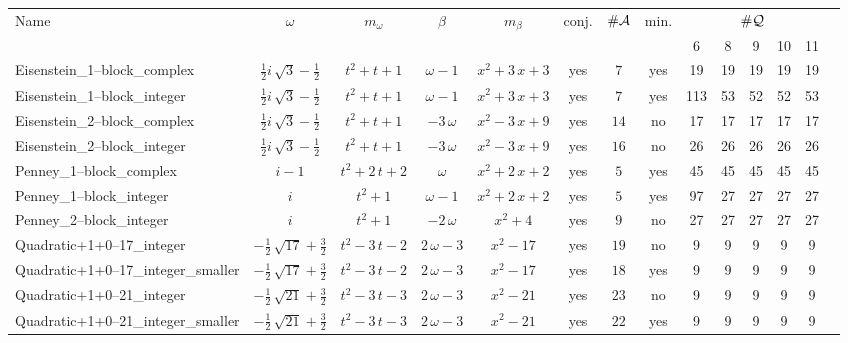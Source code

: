 \begin{tabular}{l|c c c c|ccc|c c  c  c  c  c }
\multirow{2}{*}{Name} & \multirow{2}{*}{$\omega$} & \multirow{2}{*}{$m_\omega$} & \multirow{2}{*}{$\beta$} & \multirow{2}{*}{$m_\beta$} & \multirow{2}{*}{conj.} & \multirow{2}{*}{$\#\mathcal{A}$} & \multirow{2}{*}{min.} & \multicolumn{5}{c}{$\#\mathcal{Q}$} \\
  &  &  &  &  &  &  &  & 6 & 8 & 9 & 10 & 11 \\ \hline
Eisenstein\_1--block\_complex & $ \frac{1}{2} i \, \sqrt{3} - \frac{1}{2} $ & $ t^{2} + t + 1 $ & $ \omega - 1 $ & $ x^{2} + 3 \, x + 3 $ & yes & $ 7 $ & yes & 19 & 19 & 19 & 19 & 19 \\
Eisenstein\_1--block\_integer & $ \frac{1}{2} i \, \sqrt{3} - \frac{1}{2} $ & $ t^{2} + t + 1 $ & $ \omega - 1 $ & $ x^{2} + 3 \, x + 3 $ & yes & $ 7 $ & yes & 113 & 53 & 52 & 52 & 53 \\
Eisenstein\_2--block\_complex & $ \frac{1}{2} i \, \sqrt{3} - \frac{1}{2} $ & $ t^{2} + t + 1 $ & $ -3 \, \omega $ & $ x^{2} - 3 \, x + 9 $ & yes & $ 14 $ & no & 17 & 17 & 17 & 17 & 17 \\
Eisenstein\_2--block\_integer & $ \frac{1}{2} i \, \sqrt{3} - \frac{1}{2} $ & $ t^{2} + t + 1 $ & $ -3 \, \omega $ & $ x^{2} - 3 \, x + 9 $ & yes & $ 16 $ & no & 26 & 26 & 26 & 26 & 26 \\
Penney\_1--block\_complex & $ i - 1 $ & $ t^{2} + 2 \, t + 2 $ & $ \omega $ & $ x^{2} + 2 \, x + 2 $ & yes & $ 5 $ & yes & 45 & 45 & 45 & 45 & 45 \\
Penney\_1--block\_integer & $ i $ & $ t^{2} + 1 $ & $ \omega - 1 $ & $ x^{2} + 2 \, x + 2 $ & yes & $ 5 $ & yes & 97 & 27 & 27 & 27 & 27 \\
Penney\_2--block\_integer & $ i $ & $ t^{2} + 1 $ & $ -2 \, \omega $ & $ x^{2} + 4 $ & yes & $ 9 $ & no & 27 & 27 & 27 & 27 & 27 \\
Quadratic+1+0--17\_integer & $ -\frac{1}{2} \, \sqrt{17} + \frac{3}{2} $ & $ t^{2} - 3 \, t - 2 $ & $ 2 \, \omega - 3 $ & $ x^{2} - 17 $ & yes & $ 19 $ & no & 9 & 9 & 9 & 9 & 9 \\
Quadratic+1+0--17\_integer\_smaller & $ -\frac{1}{2} \, \sqrt{17} + \frac{3}{2} $ & $ t^{2} - 3 \, t - 2 $ & $ 2 \, \omega - 3 $ & $ x^{2} - 17 $ & yes & $ 18 $ & yes & 9 & 9 & 9 & 9 & 9 \\
Quadratic+1+0--21\_integer & $ -\frac{1}{2} \, \sqrt{21} + \frac{3}{2} $ & $ t^{2} - 3 \, t - 3 $ & $ 2 \, \omega - 3 $ & $ x^{2} - 21 $ & yes & $ 23 $ & no & 9 & 9 & 9 & 9 & 9 \\
Quadratic+1+0--21\_integer\_smaller & $ -\frac{1}{2} \, \sqrt{21} + \frac{3}{2} $ & $ t^{2} - 3 \, t - 3 $ & $ 2 \, \omega - 3 $ & $ x^{2} - 21 $ & yes & $ 22 $ & yes & 9 & 9 & 9 & 9 & 9 \\

\end{tabular}
